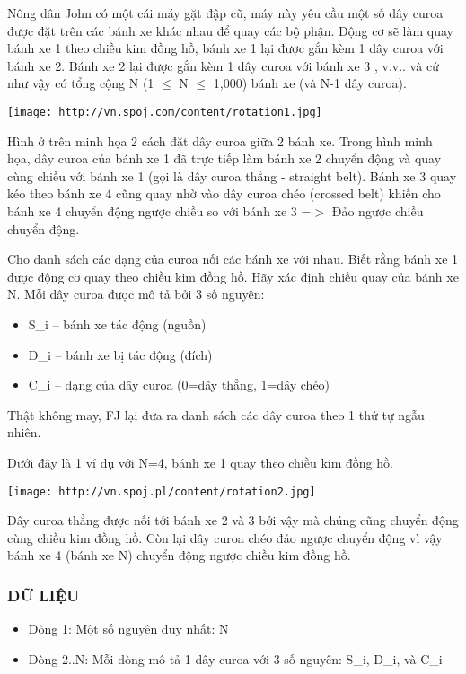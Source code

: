 



   Nông dân John có một cái máy gặt đập cũ, máy này yêu cầu một số dây  curoa được đặt trên các bánh xe khác nhau để quay các bộ phận. Động cơ sẽ làm quay bánh xe 1 theo chiều kim đồng hồ, bánh xe 1 lại được gắn kèm 1  dây curoa với bánh xe 2. Bánh xe 2 lại được gắn kèm 1 dây curoa với bánh xe 3  , v.v.. và cứ như vậy có tổng cộng N (1  $\le$  N  $\le$  1,000) bánh xe (và N-1 dây curoa).  


\texttt{[image: http://vn.spoj.com/content/rotation1.jpg]}

   Hình ở trên minh họa 2 cách đặt dây curoa giữa 2 bánh xe. Trong hình minh họa, dây curoa của bánh xe 1 đã trực tiếp làm bánh xe 2 chuyển động và quay cùng chiều với bánh xe 1 (gọi là dây curoa thẳng - straight belt). Bánh xe 3 quay kéo theo bánh xe 4 cũng quay nhờ vào dây curoa chéo (crossed belt) khiến cho bánh xe 4 chuyển động ngược chiều so với bánh xe 3 =$>$ Đảo  ngược chiều chuyển động.  

   Cho danh sách các dạng của curoa nối các bánh xe với nhau.  Biết rằng bánh xe 1 được động cơ quay theo chiều kim đồng hồ. Hãy xác định chiều quay của bánh xe N. Mỗi dây curoa được mô tả bởi 3 số nguyên:  
\begin{itemize}
	\item     S\_i -- bánh xe tác động (nguồn)   
	\item     D\_i -- bánh xe bị tác động (đích)   
	\item     C\_i -- dạng của dây curoa (0=dây thẳng, 1=dây chéo)   
\end{itemize}

   Thật không may, FJ lại đưa ra danh sách các dây curoa theo 1 thứ tự ngẫu nhiên.  

   Dưới đây là 1 ví dụ với N=4, bánh xe 1 quay theo chiều kim đồng hồ.  


\texttt{[image: http://vn.spoj.pl/content/rotation2.jpg]}

   Dây curoa thẳng được nối tới bánh xe 2 và 3 bởi vậy mà chúng cũng chuyển động cùng chiều kim đồng hồ. Còn lại dây curoa chéo đảo ngược chuyển động vì vậy  bánh xe 4 (bánh xe N) chuyển động ngược chiều kim đồng hồ.  

\subsubsection{   DỮ LIỆU  }
\begin{itemize}
	\item     Dòng 1: Một số nguyên duy nhất: N   
	\item     Dòng 2..N: Mỗi dòng mô tả 1 dây curoa với 3 số nguyên: S\_i, D\_i, và C\_i   
\end{itemize}

